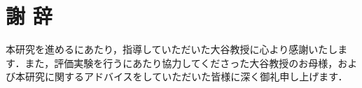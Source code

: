 \chapter*{謝 辞}

本研究を進めるにあたり，指導していただいた大谷教授に心より感謝いたします．また，評価実験を行うにあたり協力してくださった大谷教授のお母様，および本研究に関するアドバイスをしていただいた皆様に深く御礼申し上げます．